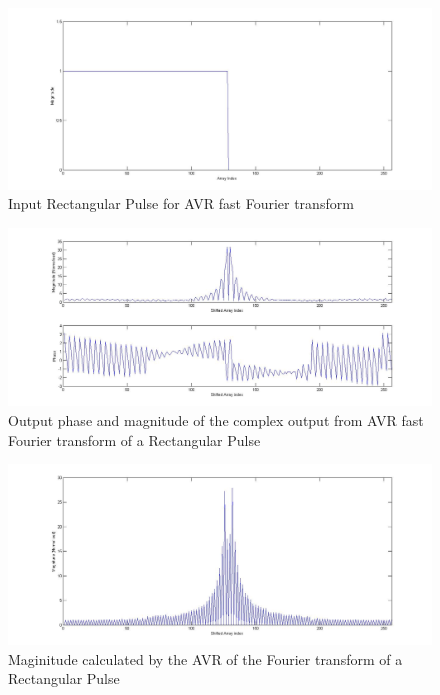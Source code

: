 \begin{figure}
\includegraphics[width=\textwidth]{./Figures/AVR_FFT_Square_Input.jpg}
\caption{Input Rectangular Pulse for AVR fast Fourier transform}
\label{fig:AVR:FFT:Square:Input}
\end{figure}
\begin{figure}
\includegraphics[width=\textwidth]{./Figures/AVR_FFT_Square_Complex_Output.jpg}
\caption{Output phase and magnitude of the complex output from AVR fast Fourier transform of a Rectangular Pulse}
\label{fig:AVR:FFT:Square:Output}
\end{figure}
\begin{figure}
\includegraphics[width=\textwidth]{./Figures/AVR_FFT_Square_Mag.jpg}
\caption{Maginitude calculated by the AVR of the Fourier transform of a Rectangular Pulse}
\label{fig:AVR:FFT:Square:Mag}
\end{figure}

